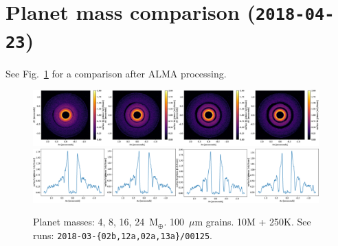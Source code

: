 \documentclass[usenatbib,a4paper,times,fleqn]{mnras}
\renewcommand{\earth}{\mathrm{M}_{\oplus}}
\begin{document}
\section*{Planet mass comparison (\texttt{2018-04-23})}

See Fig.~\ref{fig:planet-mass-comparison2} for a comparison after ALMA
processing.

\begin{figure}
   \begin{center}
      \includegraphics[width=0.98\textwidth]{figs/planet-mass-comparison-alma-100.pdf}
      \includegraphics[width=0.98\textwidth]{figs/planet-mass-comparison-alma-100-radial-cut.pdf}
      \caption{Planet masses: 4, 8, 16, 24~$\earth{}$. 100~$\mu$m grains. 10M +
      250K. See runs: \texttt{2018-03-\{02b,12a,02a,13a\}/00125}.}
      \label{fig:planet-mass-comparison2}
   \end{center}
\end{figure}
\end{document}
